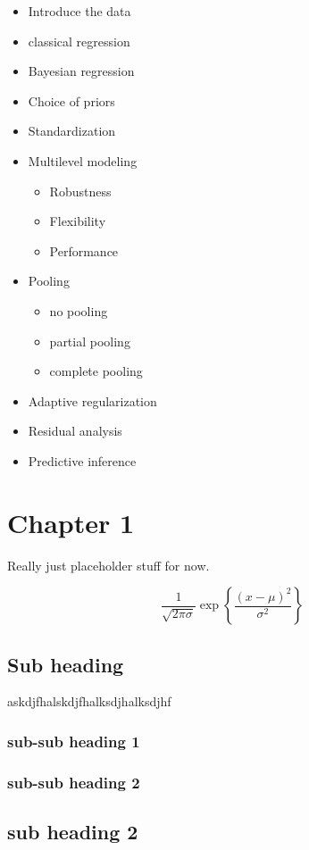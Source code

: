\documentclass[
]{article}
\providecommand{\tightlist}{%
  \setlength{\itemsep}{0pt}\setlength{\parskip}{0pt}}
\begin{document}
\begin{itemize}
\tightlist
\item
  Introduce the data
\item
  classical regression
\item
  Bayesian regression
\item
  Choice of priors
\item
  Standardization
\item
  Multilevel modeling

  \begin{itemize}
  \tightlist
  \item
    Robustness
  \item
    Flexibility
  \item
    Performance
  \end{itemize}
\item
  Pooling

  \begin{itemize}
  \tightlist
  \item
    no pooling
  \item
    partial pooling
  \item
    complete pooling
  \end{itemize}
\item
  Adaptive regularization
\item
  Residual analysis
\item
  Predictive inference
\end{itemize}

\hypertarget{chapter-1}{%
\section{Chapter 1}\label{chapter-1}}

Really just placeholder stuff for now.

\[
\frac{1}{\sqrt{2\pi\sigma}} \exp{\left\lbrace \frac{(x-\mu)^2}{\sigma^2} \right\rbrace}
\]

\hypertarget{sub-heading}{%
\subsection{Sub heading}\label{sub-heading}}

askdjfhalskdjfhalksdjhalksdjhf

\hypertarget{sub-sub-heading-1}{%
\subsubsection{sub-sub heading 1}\label{sub-sub-heading-1}}

\hypertarget{sub-sub-heading-2}{%
\subsubsection{sub-sub heading 2}\label{sub-sub-heading-2}}

\hypertarget{sub-heading-2}{%
\subsection{sub heading 2}\label{sub-heading-2}}
\end{document}
